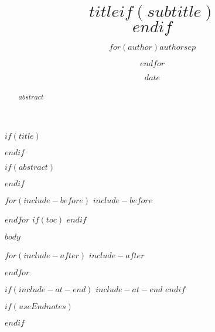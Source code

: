 \documentclass[$if(fontSize)$$fontSize$, $endif$$if(language)$$language$,$else$english,$endif$$if(paperSize)$$paperSize$,$else$ a4paper,$endif$$if(classOptions)$$classOptions$,$endif$$if(twoSided)$twosided,$endif$$if(titlepage)$titlepage$endif$]{$if(documentClass)$$documentClass$$else$article$endif$}
\title{$title$$if(subtitle)$\\\vspace{0.5em}{\large $subtitle$}$endif$}
\author{$for(author)$$author$$sep$ \and $endfor$}
\date{$date$}
\begin{document}
$if(title)$
	\maketitle
$endif$

$if(abstract)$
\begin{abstract}
	$abstract$
\end{abstract}
$endif$

$for(include-before)$
$include-before$

$endfor$
$if(toc)$
{
\hypersetup{linkcolor=black}
\setcounter{tocdepth}{$toc-depth$}
\tableofcontents
}
$endif$

$body$

$for(include-after)$
$include-after$

$endfor$

$if(include-at-end)$
$include-at-end$
$endif$

$if(useEndnotes)$
\renewcommand{\notesname}{~}



\def\enotesize{\normalsize}
\theendnotes
$endif$
\end{document}

